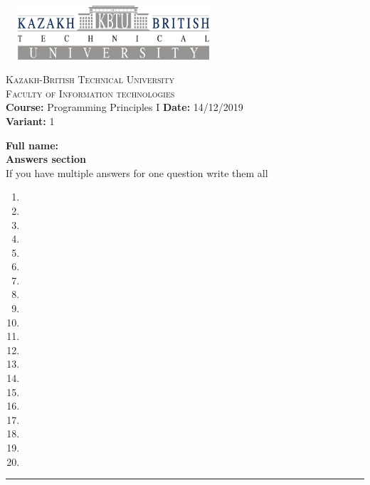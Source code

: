 \documentclass[10pt]{article}
\begin{document}
\begin{center}
\includegraphics[width=8cm, height=2cm]{kbtu.jpg}
\end{center}

\begin{center}
	\begin{minipage}{11.4cm}
		\begin{center}
				{\small \textsc{Kazakh-British Technical University}			\\
						  \textsc{Faculty of Information technologies} \\
                         \textbf{Course:} Programming Principles I \hspace{.65cm}\textbf{Date:} 14/12/2019\\\textbf{Variant:} 1\\
                }
		\end{center}
	\end{minipage}
\end{center}
\textbf{
{Full name:}\\
{Answers section}\\
}
{If you have multiple answers for one question write them all}
\begin{multicols}{5}
\begin{enumerate}
\item \item \item \item \item \item \item \item \item \item \item \item \item \item \item \item \item \item \item \item
\end{enumerate}
\end{multicols}
\medskip\hrule
\end{document}
